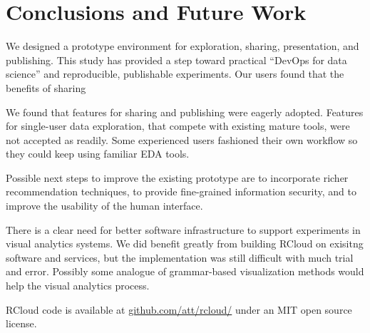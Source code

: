 \section{Conclusions and Future Work}
We designed a prototype environment for exploration, sharing,
presentation, and publishing.
This study has provided a step toward practical ``DevOps for data science''
and reproducible, publishable experiments. Our users found that the
benefits of sharing 

We found that features for sharing and publishing were eagerly adopted.
Features for single-user data exploration, that compete with existing mature
tools, were not accepted as readily. Some experienced users
fashioned their own workflow so they could keep using familiar EDA tools.

Possible next steps to improve the existing prototype are to incorporate
richer recommendation techniques, to provide fine-grained information
security, and to improve the usability of the human interface.

There is a clear need for better software infrastructure to support
experiments in visual analytics systems. We did benefit greatly from
building RCloud on exisitng software and services, but the implementation
was still difficult with much trial and error. Possibly some analogue
of grammar-based visualization methods would help the visual analytics process.

RCloud code is available at \url{github.com/att/rcloud/}
under an MIT open source license.

